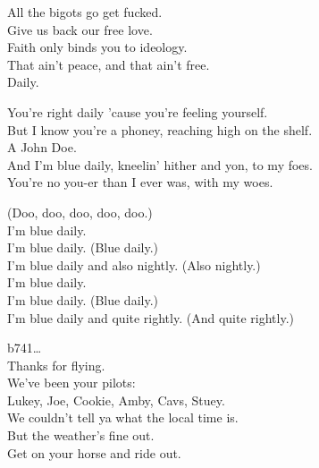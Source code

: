 All the bigots go get fucked. \\
Give us back our free love. \\
Faith only binds you to ideology. \\
That ain't peace, and that ain't free. \\
Daily. \\


You're right daily 'cause you're feeling yourself. \\
But I know you're a phoney, reaching high on the shelf. \\
A John Doe. \\
And I'm blue daily, kneelin' hither and yon, to my foes. \\
You're no you-er than I ever was, with my woes. \\


(Doo, doo, doo, doo, doo.) \\
I'm blue daily. \\
I'm blue daily. (Blue daily.) \\
I'm blue daily and also nightly. (Also nightly.) \\
I'm blue daily. \\
I'm blue daily. (Blue daily.) \\
I'm blue daily and quite rightly. (And quite rightly.) \\


b741… \\

Thanks for flying. \\
We've been your pilots: \\
Lukey, Joe, Cookie, Amby, Cavs, Stuey. \\

We couldn't tell ya what the local time is. \\
But the weather's fine out. \\
Get on your horse and ride out. \\
